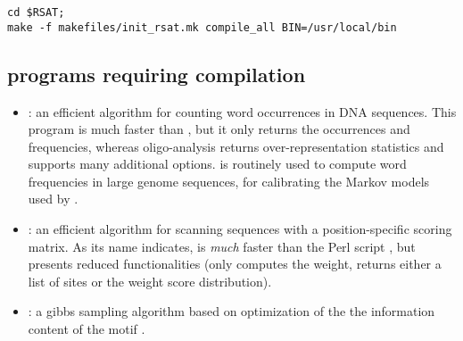 \begin{lstlisting}
cd $RSAT;
make -f makefiles/init_rsat.mk compile_all BIN=/usr/local/bin
\end{lstlisting}

\subsection{\RSAT programs requiring compilation}

\begin{itemize}

\item {}: an efficient algorithm for counting word
  occurrences in DNA sequences. This program is much faster than
  , but it only returns the occurrences and
  frequencies, whereas oligo-analysis returns over-representation
  statistics and supports many additional
  options.  is routinely used to compute word
  frequencies in large genome sequences, for calibrating the Markov
  models used by .

\item {}: an efficient algorithm for scanning
  sequences with a position-specific scoring matrix. As its name
  indicates,  is \emph{much} faster than
  the Perl script , but presents reduced
  functionalities (only computes the weight, returns either a list of
  sites or the weight score distribution).

\item {}: a gibbs sampling algorithm based on
  optimization of the the information content of the motif
  \cite{Defrance:2009}.
\end{itemize}
